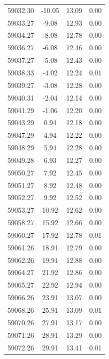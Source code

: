 \begin{longtable}{|c|c|c|c|}
 59032.30 &  -10.05 &       13.09 &          0.00 \\
 59033.27 &   -9.08 &       12.93 &          0.00 \\
 59034.27 &   -8.08 &       12.78 &          0.00 \\
 59036.27 &   -6.08 &       12.46 &          0.00 \\
 59037.27 &   -5.08 &       12.43 &          0.00 \\
 59038.33 &   -4.02 &       12.24 &          0.01 \\
 59039.27 &   -3.08 &       12.28 &          0.00 \\
 59040.31 &   -2.04 &       12.14 &          0.00 \\
 59041.29 &   -1.06 &       12.20 &          0.00 \\
 59043.29 &    0.94 &       12.18 &          0.00 \\
 59047.29 &    4.94 &       12.22 &          0.00 \\
 59048.29 &    5.94 &       12.28 &          0.00 \\
 59049.28 &    6.93 &       12.27 &          0.00 \\
 59050.27 &    7.92 &       12.45 &          0.00 \\
 59051.27 &    8.92 &       12.48 &          0.00 \\
 59052.27 &    9.92 &       12.52 &          0.00 \\
 59053.27 &   10.92 &       12.62 &          0.00 \\
 59058.27 &   15.92 &       12.66 &          0.00 \\
 59060.27 &   17.92 &       12.78 &          0.01 \\
 59061.26 &   18.91 &       12.79 &          0.00 \\
 59062.26 &   19.91 &       12.88 &          0.00 \\
 59064.27 &   21.92 &       12.86 &          0.00 \\
 59065.27 &   22.92 &       12.94 &          0.00 \\
 59066.26 &   23.91 &       13.07 &          0.00 \\
 59068.26 &   25.91 &       13.09 &          0.01 \\
 59070.26 &   27.91 &       13.17 &          0.00 \\
 59071.26 &   28.91 &       13.29 &          0.00 \\
 59072.26 &   29.91 &       13.41 &          0.01 \\

\end{longtable}
